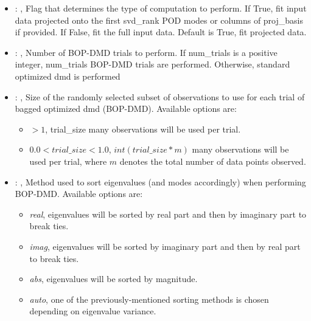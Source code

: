 \begin{itemize}
    \item {}: ,
      Flag that determines the type of computation to perform. If True, fit input
      data projected onto the first svd\_rank POD modes or columns of proj\_basis if provided.
      If False, fit the full input data. Default is True, fit projected data.

    \item {}: ,
      Number of BOP-DMD trials to perform. If num\_trials is a positive integer,
      num\_trials BOP-DMD trials are performed. Otherwise, standard optimized dmd is performed

    \item {}: ,
      Size of the randomly selected subset of observations to use for each trial of bagged optimized
      dmd (BOP-DMD).                                                  Available options are:
      \begin{itemize}                                                    \item \textit{$>1$},
      trial\_size many observations will be used per trial.
      \item $0.0 < trial\_size < 1.0$, $int(trial\_size * m)$ many observations will be used per
      trial,                                                        where $m$ denotes the total
      number of data points observed.                                                  \end{itemize}

    \item {}: ,
      Method used to sort eigenvalues (and modes accordingly) when performing BOP-DMD. Available
      options are:                                                  \begin{itemize}
      \item \textit{real}, eigenvalues will be sorted by real part and then by imaginary part to
      break ties.                                                    \item  \textit{imag},
      eigenvalues will be sorted by imaginary part and then by real part to break ties.
      \item  \textit{abs}, eigenvalues will be sorted by magnitude.
      \item  \textit{auto}, one of the previously-mentioned sorting methods is chosen depending on
      eigenvalue variance.                                                  \end{itemize}


\end{itemize}

